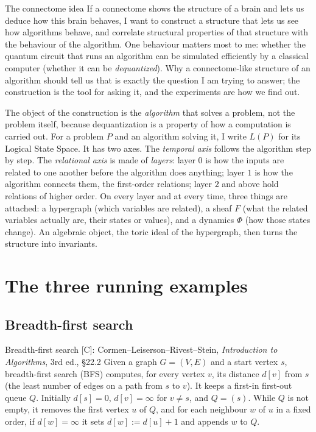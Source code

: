 \documentclass[11pt,a4paper]{article}
\newcommand{\gr}[1]{\textsf{[#1]}}
\begin{document}
\begin{why}{The connectome idea}
If a connectome shows the structure of a brain and lets us deduce how this brain behaves, I want to construct a structure that lets us see how algorithms behave, and correlate structural properties of that structure with the behaviour of the algorithm. One behaviour matters most to me: whether the quantum circuit that runs an algorithm can be simulated efficiently by a classical computer (whether it can be \emph{dequantized}). Why a connectome-like structure of an algorithm should tell us that is exactly the question I am trying to answer; the construction is the tool for asking it, and the experiments are how we find out.
\end{why}

The object of the construction is the \emph{algorithm} that solves a problem, not the problem itself, because dequantization is a property of how a computation is carried out. For a problem $P$ and an algorithm solving it, I write $L(P)$ for its Logical State Space. It has two axes. The \emph{temporal axis} follows the algorithm step by step. The \emph{relational axis} is made of \emph{layers}: layer $0$ is how the inputs are related to one another before the algorithm does anything; layer $1$ is how the algorithm connects them, the first-order relations; layer $2$ and above hold relations of higher order. On every layer and at every time, three things are attached: a hypergraph (which variables are related), a sheaf $F$ (what the related variables actually are, their states or values), and a dynamics $\Phi$ (how those states change). An algebraic object, the toric ideal of the hypergraph, then turns the structure into invariants.

\section{The three running examples}\label{sec:examples}

\subsection{Breadth-first search}

\begin{defn}{Breadth-first search \gr{C}: Cormen--Leiserson--Rivest--Stein, \emph{Introduction to Algorithms}, 3rd ed., \S22.2}
Given a graph $G=(V,E)$ and a start vertex $s$, breadth-first search (BFS) computes, for every vertex $v$, its distance $d[v]$ from $s$ (the least number of edges on a path from $s$ to $v$). It keeps a first-in first-out queue $Q$. Initially $d[s]=0$, $d[v]=\infty$ for $v\neq s$, and $Q=(s)$. While $Q$ is not empty, it removes the first vertex $u$ of $Q$, and for each neighbour $w$ of $u$ in a fixed order, if $d[w]=\infty$ it sets $d[w]:=d[u]+1$ and appends $w$ to $Q$.
\end{defn}
\end{document}

